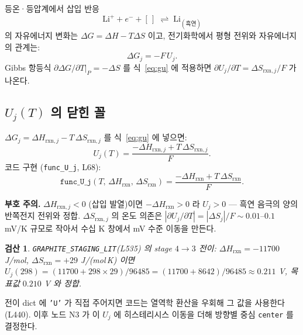 \documentclass[11pt,a4paper]{article}
\newtheorem*{verifybox}{검산}
\begin{document}
등온·등압계에서 삽입 반응
\begin{equation}
\mathrm{Li}^+ + e^- + [\,] \;\rightleftharpoons\; \mathrm{Li}_{(\text{흑연})}
\label{eq:rxn}
\end{equation}
의 자유에너지 변화는 $\Delta G = \Delta H - T\Delta S$ 이고, 전기화학에서 평형 전위와
자유에너지의 관계는:
\begin{equation}
\Delta G_j = -F\,U_j.
\label{eq:gu}
\end{equation}
Gibbs 항등식 $\partial\Delta G/\partial T\big|_P = -\Delta S$ 를 식~\eqref{eq:gu} 에
적용하면 $\partial U_j/\partial T = \Delta S_{\mathrm{rxn},j}/F$ 가 나온다.

\subsection{$U_j(T)$ 의 닫힌 꼴}

$\Delta G_j = \Delta H_{\mathrm{rxn},j} - T\,\Delta S_{\mathrm{rxn},j}$ 를 식~\eqref{eq:gu}
에 넣으면:
\begin{equation}
\boxed{U_j(T) = \frac{-\Delta H_{\mathrm{rxn},j} + T\,\Delta S_{\mathrm{rxn},j}}{F}.}
\label{eq:Uj}
\end{equation}
코드 구현 (\texttt{func\_U\_j}, L68):
\begin{equation*}
\texttt{func\_U\_j}(T,\,\Delta H_{\mathrm{rxn}},\,\Delta S_{\mathrm{rxn}})
= \frac{-\Delta H_{\mathrm{rxn}} + T\,\Delta S_{\mathrm{rxn}}}{F}.
\end{equation*}

\textbf{부호 주의.} $\Delta H_{\mathrm{rxn},j}<0$ (삽입 발열)이면 $-\Delta H_{\mathrm{rxn}}>0$
라 $U_j>0$ — 흑연 음극의 양의 반쪽전지 전위와 정합. $\Delta S_{\mathrm{rxn},j}$
의 온도 의존은 $|\partial U_j/\partial T| = |\Delta S_j|/F \sim 0.01$--$0.1$ mV/K 규모로
작아서 수십 K 창에서 mV 수준 이동을 만든다.

\begin{verifybox}
\texttt{GRAPHITE\_STAGING\_LIT}(L535) 의 stage $4\to3$ 전이:
$\Delta H_{\mathrm{rxn}}=-11700$ J/mol, $\Delta S_{\mathrm{rxn}}=+29$ J/(mol\,K) 이면
$U_j(298) = (11700 + 298\times29)/96485 = (11700+8642)/96485 \approx 0.211$ V,
목표값 $0.210$ V 와 정합.
\end{verifybox}

전이 dict 에 \texttt{'U'} 가 직접 주어지면 코드는 열역학 환산을 우회해 그 값을 사용한다
(L440). 이후 노드 N3 가 이 $U_j$ 에 히스테리시스 이동을 더해 방향별 중심 \texttt{center}
를 결정한다.

\end{document}
